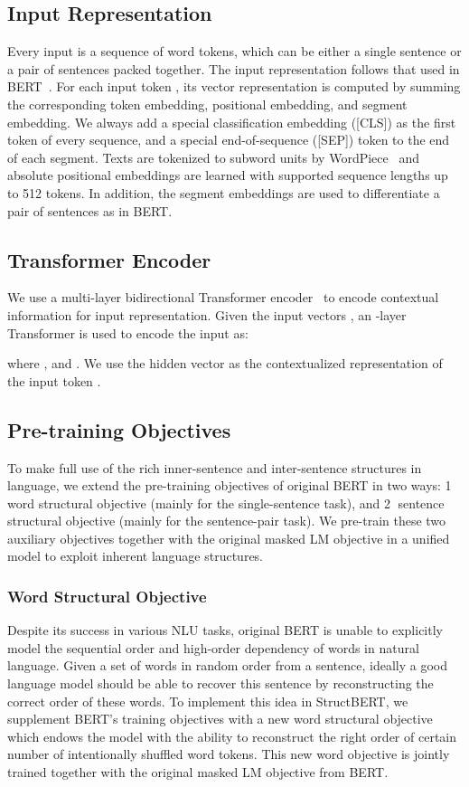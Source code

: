 \documentclass{article}
\begin{document}
\subsection{Input Representation}
Every input  is a sequence of word tokens, which can be either a single sentence or a pair of sentences packed together. The input representation follows that used in BERT~\cite{devlin2018bert}. For each input token , its vector representation  is computed by summing the corresponding token embedding, positional embedding, and segment embedding. We always add a special classification embedding ([CLS]) as the first token of every sequence, and a special end-of-sequence ([SEP]) token to the end of each segment. Texts are tokenized to subword units by WordPiece~\cite{wu2016google} and absolute positional embeddings are learned with supported sequence lengths up to 512 tokens. In addition, the segment embeddings are used to differentiate a pair of sentences as in BERT.

\subsection{Transformer Encoder}
We use a multi-layer bidirectional Transformer encoder~\cite{vaswani2017attention} to encode contextual information for input representation. Given the input vectors , an -layer Transformer is used to encode the input as:

where ,  and . We use the hidden vector  as the contextualized representation of the input token .

\subsection{Pre-training Objectives}
To make full use of the rich inner-sentence and inter-sentence structures in language, we extend the pre-training objectives of original BERT in two ways: \textcircled{1} word structural objective (mainly for the single-sentence task), and \textcircled{2} sentence structural objective (mainly for the sentence-pair task). We pre-train these two auxiliary objectives together with the original masked LM objective in a unified model to exploit inherent language structures.

\subsubsection{Word Structural Objective}
Despite its success in various NLU tasks, original BERT is unable to explicitly model the sequential order and high-order dependency of words in natural language. Given a set of words in random order from a sentence, ideally a good language model should be able to recover this sentence by reconstructing the correct order of these words. To implement this idea in StructBERT, we supplement BERT's training objectives with a new word structural objective which endows the model with the ability to reconstruct the right order of certain number of intentionally shuffled word tokens. This new word objective is jointly trained together with the original masked LM objective from BERT.
\end{document}
